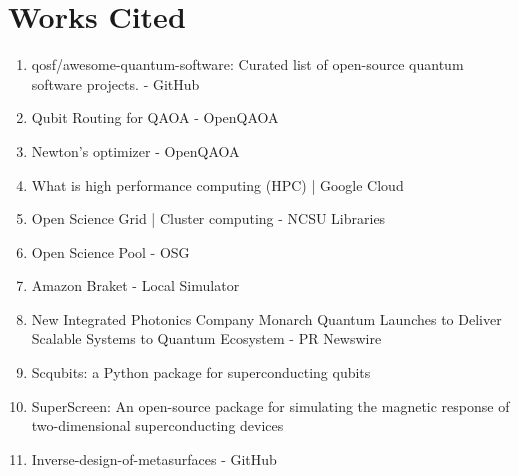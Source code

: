 \documentclass[11pt, a4paper]{article}
\begin{document}
\section*{Works Cited}
\begin{enumerate}
    \item qosf/awesome-quantum-software: Curated list of open-source quantum software projects. - GitHub
    \item Qubit Routing for QAOA - OpenQAOA
    \item Newton's optimizer - OpenQAOA
    \item What is high performance computing (HPC) | Google Cloud
    \item Open Science Grid | Cluster computing - NCSU Libraries
    \item Open Science Pool - OSG
    \item Amazon Braket - Local Simulator
    \item New Integrated Photonics Company Monarch Quantum Launches to Deliver Scalable Systems to Quantum Ecosystem - PR Newswire
    \item Scqubits: a Python package for superconducting qubits
    \item SuperScreen: An open-source package for simulating the magnetic response of two-dimensional superconducting devices
    \item Inverse-design-of-metasurfaces - GitHub
\end{enumerate}
\end{document}
